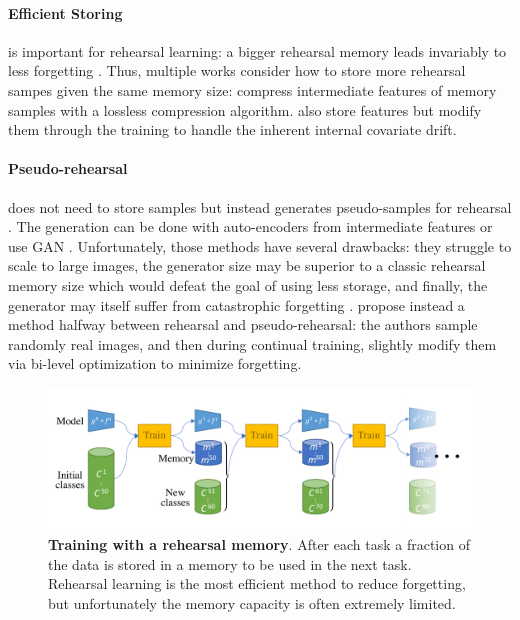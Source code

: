 \paragraph{Efficient Storing} is important for rehearsal learning: a bigger rehearsal memory leads
invariably to less forgetting \citep{hou2019ucir}. Thus, multiple works consider how to store more
rehearsal sampes given the same memory size: \cite{hayes2020remind} compress intermediate features
of memory samples with a lossless compression algorithm.
\cite{iscen2020incrementalfeatureadaptation} also store features but modify them through the
training to handle the inherent internal covariate drift.

\paragraph{Pseudo-rehearsal} does not need to store samples but instead generates pseudo-samples for
rehearsal \citep{lesort2019generative}. The generation can be done with auto-encoders from
intermediate features \citep{kemker2018fearnet,ayub2021eec} or use \ac{GAN}
\citep{shin2017deep_generative_replay}. Unfortunately, those methods have several drawbacks: they
struggle to scale to large images, the generator size may be superior to a classic rehearsal memory
size which would defeat the goal of using less storage, and finally, the generator may itself suffer
from catastrophic forgetting \citep{zhai2019lifelonggan}. \cite{liu2020mnemonics} propose instead a
method halfway between rehearsal and pseudo-rehearsal: the authors sample randomly real images, and
then during continual training, slightly modify them via bi-level optimization
\citep{wang2018datasetdistillation} to minimize forgetting.


\begin{figure}[tb]
      \begin{center}
            \includegraphics[width=1.0\linewidth]{images/related/rehearsal}
      \end{center}
      \caption{\textbf{Training with a rehearsal memory}. After each task a fraction of the
            data is stored in a memory to be used in the next task. Rehearsal learning is the most
            efficient method to reduce forgetting, but unfortunately the memory capacity is often
            extremely limited.}
      \label{fig:related_protocol_rehearsal}
\end{figure}

